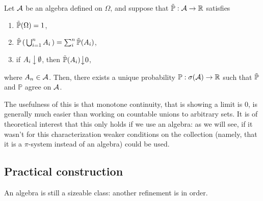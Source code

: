 \goodbreak\begin{my_lemma}
	Let $\mathcal{A}$ be an algebra defined on $\Omega$, and suppose that $\tilde{\mathbb{P}}:\mathcal{A}\to\mathbb{R}$ satisfies
	\begin{enumerate}
		\item $\tilde{\mathbb{P}}(\Omega)=1$,
		\item $\tilde{\mathbb{P}} \left( \, \bigcup^n_{i=1} A_i \, \right) = \sum^n_i \tilde{\mathbb{P}}(A_i)$,
		\item if $A_i \, \big \downarrow \, \emptyset$, then $\tilde{\mathbb{P}}(A_i) \big \downarrow0$,
	\end{enumerate}
	where $A_n\in\mathcal{A}$.
	Then, there exists a unique probability $\mathbb{P}: \sigma ( \mathcal{A} ) \to \mathbb{R}$ such that $\tilde{\mathbb{P}}$ and $\mathbb{P}$ agree on $\mathcal{A}$.
\end{my_lemma}
\begin{my_remark}
	The usefulness of this is that monotone continuity, that is showing a limit is $0$, is generally much easier than working on countable unions to arbitrary sets. 
	It is of theoretical interest that this only holds if we use an algebra: as we will see, if it wasn't for this characterization weaker conditions on the collection (namely, that it is a $\pi$-system instead of an algebra) could be used.
\end{my_remark}

\subsection{Practical construction}

An algebra is still a sizeable class: another refinement is in order.


